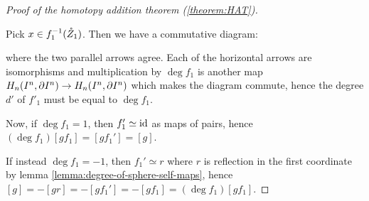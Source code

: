 \begin{proof}[Proof of the homotopy addition theorem (\ref{theorem:HAT})]
\begin{claimproof}
Pick $x\in f_1^{-1}(\mathring Z_1)$. Then we have a commutative diagram:
\begin{center}
\end{center}
where the two parallel arrows agree. Each of the horizontal arrows are isomorphisms and multiplication by $\deg f_1$ is another map $H_n(I^n,\partial I^n)\to H_n(I^n,\partial I^n)$ which makes the diagram commute, hence the degree $d'$ of $f'_1$ must be equal to $\deg f_1$.
\end{claimproof}

Now, if $\deg f_1=1$, then $f_1'\simeq\operatorname{id}$ as maps of pairs, hence $(\deg f_1)[gf_1]=[gf_1']=[g]$.

If instead $\deg f_1=-1$, then $f_1'\simeq r$ where $r$ is reflection in the first coordinate by lemma \ref{lemma:degree-of-sphere-self-maps}, hence $[g]=-[gr]=-[gf_1']=-[gf_1]=(\deg f_1)[gf_1]$.

\end{proof}
